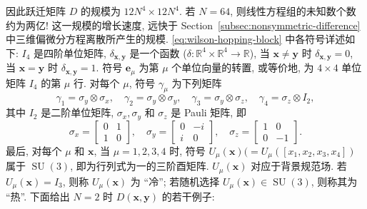 {因此跃迁矩阵 $D$ 的规模为 $12N^4\times12N^4$. 若 $N=64$, 则线性方程组的未知数个数约为两亿! 这一规模的增长速度, 远快于 Section\ \ref{subsec:nonsymmetric-difference} 中三维偏微分方程离散所产生的规模.}
{\eqref{eq:wilson-hopping-block} 中各符号详述如下: $I_4$ 是四阶单位矩阵, $\delta_{\boldsymbol{x},\boldsymbol{y}}$ 是一个函数 ($\delta:\mathbb{R}^4\times\mathbb{R}^4\to\mathbb{R}$), 当 $\boldsymbol{x}\ne\boldsymbol{y}$ 时 $\delta_{\boldsymbol{x},\boldsymbol{y}}=0$, 当 $\boldsymbol{x}=\boldsymbol{y}$ 时 $\delta_{\boldsymbol{x},\boldsymbol{y}}=1$. 符号 $\boldsymbol{e}_\mu$ 为第 $\mu$ 个单位向量的转置, 或等价地, 为 $4\times4$ 单位矩阵 $I_4$ 的第 $\mu$ 行. 对每个 $\mu$, 符号 $\gamma_\mu$ 为下列矩阵}
\[\gamma_1=\sigma_y\otimes\sigma_x,\quad\gamma_2=\sigma_y\otimes\sigma_y,\quad\gamma_3=\sigma_y\otimes\sigma_z,\quad\gamma_4=\sigma_z\otimes I_2,\]
{其中 $I_2$ 是二阶单位矩阵, $\sigma_x,\sigma_y$ 和 $\sigma_z$ 是 Pauli 矩阵, 即}
\[\sigma_x=\begin{bmatrix}0&1\\1&0\end{bmatrix},\quad\sigma_y=\begin{bmatrix}0&-i\\i&0\end{bmatrix},\quad\sigma_z=\begin{bmatrix}1&0\\0&-1\end{bmatrix}.\]
{最后, 对每个 $\mu$ 和 $\boldsymbol{x}$, 当 $\mu=1,2,3,4$ 时, 符号 $U_\mu(\boldsymbol{x})(=U_\mu([x_1,x_2,x_3,x_4])$ 属于 $\operatorname{SU}(3)$, 即为行列式为一的三阶酉矩阵. $U_\mu(\boldsymbol{x})$ 对应于背景规范场. 若 $U_\mu(\boldsymbol{x})=I_3$, 则称 $U_\mu(\boldsymbol{x})$ 为 ``冷''; 若随机选择 $U_\mu(\boldsymbol{x})\in\operatorname{SU}(3)$, 则称其为 ``热''. 下面给出 $N=2$ 时 $D(\boldsymbol{x},\boldsymbol{y})$ 的若干例子:}
